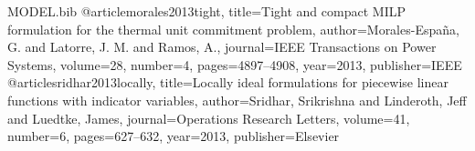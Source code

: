 \documentclass{article}
\begin{document}
\begin{filecontents*}{MODEL.bib}
@article{morales2013tight,
	title={Tight and compact {MILP} formulation for the thermal unit commitment problem},
	author={Morales-Espa{\~n}a, G. and Latorre, J. M. and Ramos, A.},
	journal={IEEE Transactions on Power Systems},
	volume={28},
	number={4},
	pages={4897--4908},
	year={2013},
	publisher={IEEE}
}
@article{sridhar2013locally,
	title={Locally ideal formulations for piecewise linear functions with indicator variables},
	author={Sridhar, Srikrishna and Linderoth, Jeff and Luedtke, James},
	journal={Operations Research Letters},
	volume={41},
	number={6},
	pages={627--632},
	year={2013},
	publisher={Elsevier}
}
\end{filecontents*}


	
\end{document}
